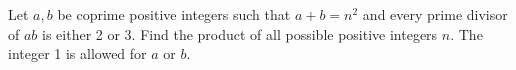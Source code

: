 Let $a,b$ be coprime positive integers such that $a+b=n^2$ and every prime divisor of $ab$ is either 2 or 3. Find the product of all possible positive integers $n$. The integer 1 is allowed for $a$ or $b$.
